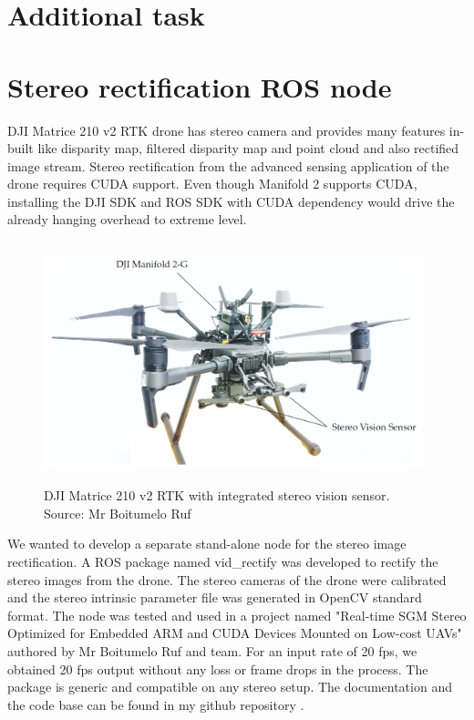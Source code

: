 \section*{Additional task}
\section{Stereo rectification ROS node}
\label{sec:stereorectinode}
DJI Matrice 210 v2 RTK drone has stereo camera and provides many features in-built like disparity map, filtered disparity map and point cloud and also rectified image stream. Stereo rectification from the advanced sensing application of the drone requires CUDA support. Even though Manifold 2 supports CUDA, installing the DJI SDK and ROS SDK with CUDA dependency would drive the already hanging overhead to extreme level. \\

\begin{figure}[h]
    \centering
    \includegraphics[width=11cm,height=7cm]{Images/djidronewithstereo.PNG}
    \caption{DJI Matrice 210 v2 RTK with integrated stereo vision sensor. Source: Mr Boitumelo Ruf}
    \label{fig:dronestereo}
\end{figure}

We wanted to develop a separate stand-alone node for the stereo image rectification. A ROS package named vid\_rectify \cite{vid_rectify} was developed to rectify the stereo images from the drone. The stereo cameras of the drone were calibrated and the stereo intrinsic parameter file was generated in OpenCV \cite{opencv_library} standard format. The node was tested and used in a project named "Real-time SGM Stereo Optimized for
Embedded ARM and CUDA Devices Mounted on Low-cost UAVs" authored by Mr Boitumelo Ruf and team. For an input rate of 20 fps, we obtained 20 fps output without any loss or frame drops in the process. The package is generic and compatible on any stereo setup. The documentation and the code base can be found in my github repository \cite{vid_rectify}.
 



